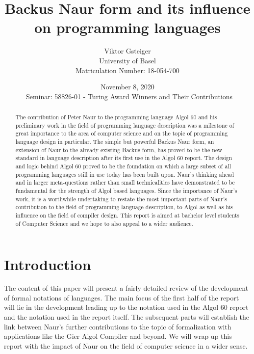 \documentclass{article}
\author{Viktor Gsteiger \\ University of Basel \\ Matriculation Number: 18-054-700}
\title{Backus Naur form and its influence on programming languages}
\date{November 8, 2020 \\\ Seminar: 58826-01 - Turing Award Winners and Their Contributions}
\begin{document}
\maketitle

\begin{abstract}
	The contribution of Peter Naur to the programming language Algol 60 and his preliminary work in the field of programming language description was a milestone of great importance to the area of computer science and on the topic of programming language design in particular. The simple but powerful Backus Naur form, an extension of Naur to the already existing Backus form, has proved to be the new standard in language description after its first use in the Algol 60 report. The design and logic behind Algol 60 proved to be the foundation on which a large subset of all programming languages still in use today has been built upon. Naur’s thinking ahead and in larger meta-questions rather than small technicalities have demonstrated to be fundamental for the strength of Algol based languages. Since the importance of Naur’s work, it is a worthwhile undertaking to restate the most important parts of Naur’s contribution to the field of programming language description, to Algol as well as his influence on the field of compiler design. This report is aimed at bachelor level students of Computer Science and we hope to also appeal to a wider audience.
\end{abstract}

\newpage

\section{Introduction}
The content of this paper will present a fairly detailed review of the development of formal notations of languages. The main focus of the first half of the report will lie in the development leading up to the notation used in the Algol 60 report and the notation used in the report itself. The subsequent parts will establish the link between Naur's further contributions to the topic of formalization with applications like the Gier Algol Compiler and beyond. We will wrap up this report with the impact of Naur on the field of computer science in a wider sense.
\end{document}
